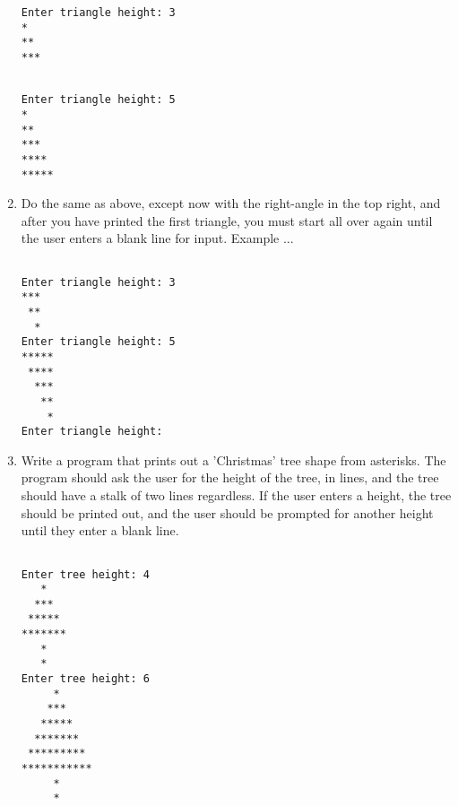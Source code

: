 \begin{enumerate}
\begin{lstlisting}
Enter triangle height: 3
*
**
***
\end{lstlisting}
\begin{lstlisting}

Enter triangle height: 5
*
**
***
****
*****
\end{lstlisting}
	\item Do the same as above, except now with the right-angle in the top right, and after you have printed the first triangle, you must start all over again until the user enters a blank line for input. Example ...      
\begin{lstlisting}

Enter triangle height: 3
***
 **
  *
Enter triangle height: 5
*****
 ****
  ***
   **
    *
Enter triangle height: 
\end{lstlisting}
	\item Write a program that prints out a 'Christmas' tree shape from    asterisks. The program should ask the user for the height of the    tree, in lines, and the tree should have a stalk of two lines    regardless. If the user enters a height, the tree should be printed    out, and the user should be prompted for another height until they    enter a blank line.     
\begin{lstlisting}

Enter tree height: 4
   *
  ***
 *****
*******
   *
   *
Enter tree height: 6
     *
    ***
   *****
  *******
 *********
***********
     *
     *
\end{lstlisting}
\end{enumerate}    
